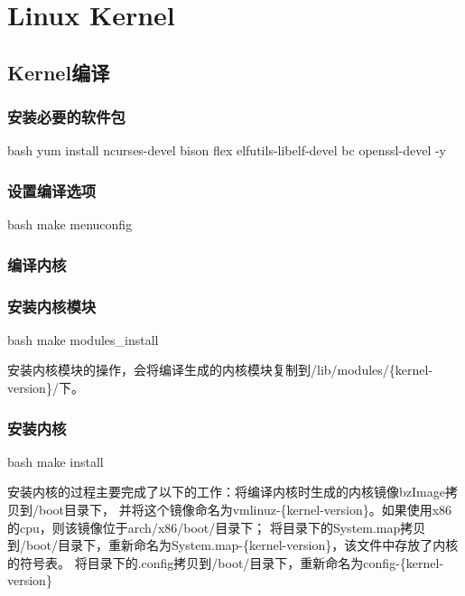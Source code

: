 \chapter{Linux Kernel}
\section{Kernel编译}
\subsection{安装必要的软件包}
\begin{code-block}{bash}
yum install ncurses-devel bison flex elfutils-libelf-devel bc openssl-devel -y
\end{code-block}

\subsection{设置编译选项}
\begin{code-block}{bash}
make menuconfig
\end{code-block}

\subsection{编译内核}

\subsection{安装内核模块}
\begin{code-block}{bash}
make modules_install
\end{code-block}

安装内核模块的操作，会将编译生成的内核模块复制到/lib/modules/\{kernel-version\}/下。

\subsection{安装内核}
\begin{code-block}{bash}
make install
\end{code-block}

安装内核的过程主要完成了以下的工作：将编译内核时生成的内核镜像bzImage拷贝到/boot目录下，
并将这个镜像命名为vmlinuz-\{kernel-version\}。如果使用x86的cpu，则该镜像位于arch/x86/boot/目录下；
将目录下的System.map拷贝到/boot/目录下，重新命名为System.map-\{kernel-version\}，该文件中存放了内核的符号表。
将目录下的.config拷贝到/boot/目录下，重新命名为config-\{kernel-version\}

